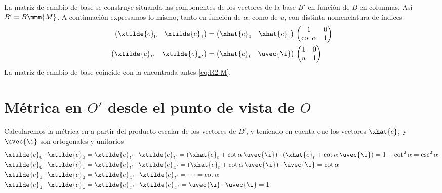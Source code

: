 La matriz de cambio de base se construye situando las componentes de los vectores de la
base $B'$ en función de $B$ en columnas. Así $B' = B \mmm{M}$. A continuación
expresamos lo mismo, tanto en función de $\alpha$, como de $u$, con distinta
nomenclatura de índices
\begin{subequations}
  \begin{align}
    \begin{pmatrix}
      \xtilde{e}_0 & \xtilde{e}_1
    \end{pmatrix}
    &=
    \begin{pmatrix}
      \xhat{e}_0 & \xhat{e}_1
    \end{pmatrix}
    \,
    \begin{pmatrix}
      1 & 0\\
      \cot\alpha & 1
    \end{pmatrix}\\
    \begin{pmatrix}
      \xtilde{e}_{t'} & \xtilde{e}_{x'}
    \end{pmatrix}
    &=
      \begin{pmatrix}
        \xhat{e}_{t} & \uvec{\i}
      \end{pmatrix}
      \,
      \begin{pmatrix}
        1 & 0\\
        u & 1
      \end{pmatrix}
  \end{align}
\end{subequations}
La matriz de cambio de base coincide con la encontrada antes \eqref{eq:R2-M}.

\section{Métrica en $O'$ desde el punto de vista de $O$}
Calcularemos la métrica en a partir del producto escalar de los vectores de $B'$,
y teniendo en cuenta que los vectores $\xhat{e}_t$ y $\uvec{\i}$ son ortogonales y
unitarios
{\small
\begin{subequations}
  \begin{align}
    \xtilde{e}_0\cdot\xtilde{e}_0
    &= \xtilde{e}_{t'}\cdot\xtilde{e}_{t'}
      = (\xhat{e}_t+\cot\alpha\,\uvec{\i})\cdot(\xhat{e}_t+\cot\alpha\,\uvec{\i})
      = 1 + \cot^2\alpha = \csc^2\alpha\\
    \xtilde{e}_0\cdot\xtilde{e}_1
    &= \xtilde{e}_{t'}\cdot\xtilde{e}_{x'}
      = (\xhat{e}_t + \cot\alpha\,\uvec{\i})\cdot\uvec{\i}=\cot\alpha\\
    \xtilde{e}_1\cdot\xtilde{e}_0
    &= \xtilde{e}_{x'}\cdot\xtilde{e}_{t'}= \cdots = \cot\alpha\\
    \xtilde{e}_1\cdot\xtilde{e}_1
    &= \xtilde{e}_{x'}\cdot\xtilde{e}_{x'}
      = \uvec{\i}\cdot\uvec{\i}
      = 1
  \end{align}
\end{subequations}
}

